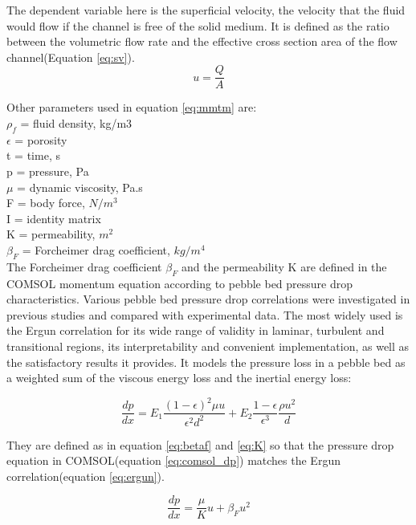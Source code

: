 \documentclass{elsarticle}
\begin{document}
The dependent variable here is the superficial velocity, the velocity that the fluid would flow if the channel is free of the solid medium. It is defined as the ratio between the volumetric flow rate and the effective cross section area of the flow channel(Equation \ref{eq:sv}).
\begin{equation}
  u=\frac{Q}{A}
  \label{eq:sv}
\end{equation}

Other parameters used in equation \ref{eq:mmtm} are:\\
$\rho_f$ = fluid density, kg/m3\\
$\epsilon$ = porosity\\
t = time, s\\
p = pressure, Pa\\
$\mu$ = dynamic viscosity, Pa.s\\
F = body force, $N/m^3$\\
I = identity matrix\\
K = permeability, $m^2$\\
$\beta_F$ = Forcheimer drag coefficient, $kg/m^4$\\

The Forcheimer drag coefficient $\beta_F$ and the permeability K are defined in the COMSOL momentum equation according to pebble bed pressure drop characteristics. 
Various pebble bed pressure drop correlations were investigated in previous studies\cite{Scarlat2012} and compared with experimental data\cite{Kang2010}. The most widely used is the Ergun correlation\cite{Ergun1949} for its wide range of validity in laminar, turbulent and transitional regions, its interpretability and convenient implementation, as well as the satisfactory results it provides. It models the pressure loss in a pebble bed as a weighted sum of the viscous energy loss and the inertial energy loss: 


\begin{equation}
  \frac{dp}{dx} = E_1 \frac{(1-\epsilon)^2\mu u}{\epsilon ^2 d^2} + E_2 \frac{1-\epsilon}{\epsilon^3}\frac{\rho u^2}{d}
  \label{eq:ergun}
\end{equation}



They are defined as in equation \ref{eq:betaf} and \ref{eq:K} so that the pressure drop equation in COMSOL(equation \ref{eq:comsol_dp}) matches the Ergun correlation(equation \ref{eq:ergun}).

\begin{equation}
  \frac{dp}{dx} = \frac{\mu}{K}u + \beta_F u^2
  \label{eq:comsol_dp}
\end{equation}
\end{document}
